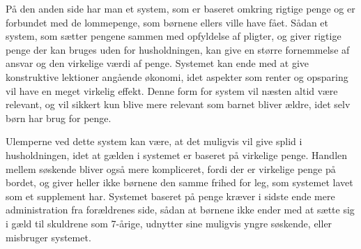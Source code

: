På den anden side har man et system, som er baseret omkring rigtige penge og er forbundet med de lommepenge, som børnene ellers ville have fået. Sådan et system, som sætter pengene sammen med opfyldelse af pligter, og giver rigtige penge der kan bruges uden for husholdningen, kan give en større fornemmelse af ansvar og den virkelige værdi af penge. Systemet kan ende med at give konstruktive lektioner angående økonomi, idet aspekter som renter og opsparing vil have en meget virkelig effekt. Denne form for system vil næsten altid være relevant, og vil sikkert kun blive mere relevant som barnet bliver ældre, idet selv børn har brug for penge.

Ulemperne ved dette system kan være, at det muligvis vil give splid i husholdningen, idet at gælden i systemet er baseret på virkelige penge. Handlen mellem søskende bliver også mere kompliceret, fordi der er virkelige penge på bordet, og giver heller ikke børnene den samme frihed for leg, som systemet lavet som et supplement har. Systemet baseret på penge kræver i sidste ende mere administration fra forældrenes side, sådan at børnene ikke ender med at sætte sig i gæld til skuldrene som 7-årige, udnytter sine muligvis yngre søskende, eller misbruger systemet.
 
